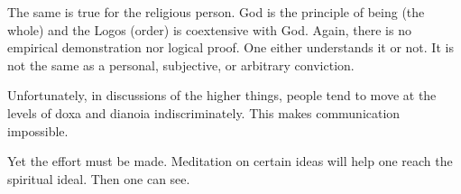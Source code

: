 The same is true for the religious person. God is the principle of being (the whole) and the Logos (order) is coextensive with God. Again, there is no empirical demonstration nor logical proof. One either understands it or not. It is not the same as a personal, subjective, or arbitrary conviction.

Unfortunately, in discussions of the higher things, people tend to move at the levels of doxa and dianoia indiscriminately. This makes communication impossible.

Yet the effort must be made. Meditation on certain ideas will help one reach the spiritual ideal. Then one can see.



